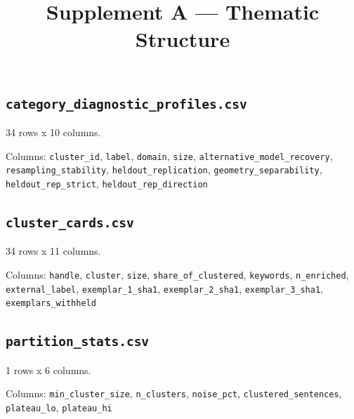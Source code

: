 \documentclass[10pt,a4paper]{article}
\title{\vspace{-14mm}\large Supplement A --- Thematic Structure}
\author{}\date{}
\begin{document}
\maketitle\thispagestyle{fancy}
\subsection*{\texttt{category\_\allowbreak{}diagnostic\_\allowbreak{}profiles.csv}}
34 rows x 10 columns.

{\raggedright Columns: \texttt{cluster\_\allowbreak{}id}, \texttt{label}, \texttt{domain}, \texttt{size}, \texttt{alternative\_\allowbreak{}model\_\allowbreak{}recovery}, \texttt{resampling\_\allowbreak{}stability}, \texttt{heldout\_\allowbreak{}replication}, \texttt{geometry\_\allowbreak{}separability}, \texttt{heldout\_\allowbreak{}rep\_\allowbreak{}strict}, \texttt{heldout\_\allowbreak{}rep\_\allowbreak{}direction}\par}

\subsection*{\texttt{cluster\_\allowbreak{}cards.csv}}
34 rows x 11 columns.

{\raggedright Columns: \texttt{handle}, \texttt{cluster}, \texttt{size}, \texttt{share\_\allowbreak{}of\_\allowbreak{}clustered}, \texttt{keywords}, \texttt{n\_\allowbreak{}enriched}, \texttt{external\_\allowbreak{}label}, \texttt{exemplar\_\allowbreak{}1\_\allowbreak{}sha1}, \texttt{exemplar\_\allowbreak{}2\_\allowbreak{}sha1}, \texttt{exemplar\_\allowbreak{}3\_\allowbreak{}sha1}, \texttt{exemplars\_\allowbreak{}withheld}\par}

\subsection*{\texttt{partition\_\allowbreak{}stats.csv}}
1 rows x 6 columns.

{\raggedright Columns: \texttt{min\_\allowbreak{}cluster\_\allowbreak{}size}, \texttt{n\_\allowbreak{}clusters}, \texttt{noise\_\allowbreak{}pct}, \texttt{clustered\_\allowbreak{}sentences}, \texttt{plateau\_\allowbreak{}lo}, \texttt{plateau\_\allowbreak{}hi}\par}
\end{document}
